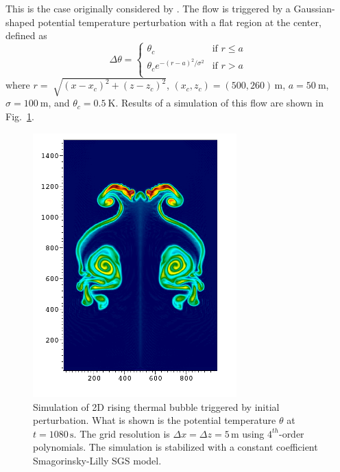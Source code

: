 \documentclass{report}
\begin{document}
This is the case originally considered by \cite{robert1993}. The flow is triggered by a Gaussian-shaped potential temperature perturbation with a flat region at the center, defined as
\begin{equation}
 \Delta\theta = \left\{ \begin{array}{ll}
 \theta_c & \text{if } r \leq a\\
 \theta_c e^{-(r - a)^2/\sigma^2} & \text{if } r > a\\
\end{array} \right.
\label{e:robertIni}
\end{equation}
where $r = \sqrt[]{(x-x_{c})^{2} + (z-z_{c})^{2}}$, $(x_c,z_c) = (500,260)\,\mathrm{m}$, $a=50~\mathrm{m}$, $\sigma = 100~\mathrm{m}$, and $\theta_c=0.5~\mathrm{K}$. Results of a simulation of this flow are shown in Fig.~\ref{fig:benchmarks/robert_bubble}.
\begin{figure}
\centerline{\includegraphics[width=0.7\textwidth]{figures/benchmarks/rtb/RTB-Robert--smgo-5mX5m-1080s0000.png}}
\caption{Simulation of 2D rising thermal bubble triggered by initial perturbation. What is shown is the potential temperature $\theta$ at $t=1080\,\mathrm{s}$. The grid resolution is $\Delta x = \Delta z = 5\,\mathrm{m}$ using $4^{th}$-order polynomials. The simulation is stabilized with a constant coefficient Smagorinsky-Lilly SGS model.}
\label{fig:benchmarks/robert_bubble}
\end{figure}
\end{document}

